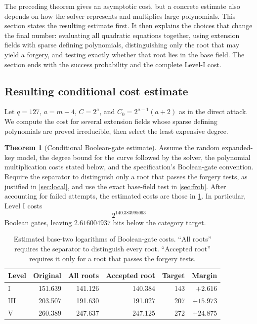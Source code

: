 \documentclass[11pt,a4paper]{article}
\theoremstyle{definition}
\newtheorem{theorem}{Theorem}[section]
\theoremstyle{remark}
\begin{document}
The preceding theorem gives an asymptotic cost, but a concrete estimate also
depends on how the solver represents and multiplies large polynomials.  This
section states the resulting estimate first.  It then explains the choices
that change the final number: evaluating all quadratic equations together,
using extension fields with sparse defining polynomials, distinguishing only
the root that may yield a forgery, and testing exactly whether that root lies
in the base field.  The section ends with the success probability and the
complete Level-I cost.

\subsection{Resulting conditional cost estimate}\label{sec:local-separator-upgrade}

Let $q=127$, $a=m-4$, $C=2^a$, and $C_0=2^{a-1}(a+2)$ as in the direct
attack.  We compute the cost for several extension fields whose sparse
defining polynomials are proved irreducible, then select the least expensive
degree.

\begin{theorem}[Conditional Boolean-gate estimate]\label{thm:headline}
Assume the random expanded-key model, the degree bound for the curve followed
by the solver, the polynomial multiplication costs stated below, and the
specification's Boolean-gate convention.  Require the separator to distinguish
only a root that passes the forgery tests, as justified in \cref{sec:local},
and use the exact base-field test in \cref{sec:frob}.  After accounting for
failed attempts, the estimated costs are those in \cref{tab:headline}.  In
particular, Level I costs
\[
 2^{140.383995063}
\]
Boolean gates, leaving $2.616004937$ bits below the category target.
\end{theorem}

\begin{table}[ht]
\centering
\caption{Estimated base-two logarithms of Boolean-gate costs.  ``All roots''
requires the separator to distinguish every root.  ``Accepted root'' requires
it only for a root that passes the forgery tests.}
\label{tab:headline}
\begin{tabular}{@{}lrrrrr@{}}
\toprule
Level & Original & All roots & Accepted root & Target & Margin\\
\midrule
I   & 151.639 & 141.126 & 140.384 & 143 & $+2.616$\\
III & 203.507 & 191.630 & 191.027 & 207 & $+15.973$\\
V   & 260.389 & 247.637 & 247.125 & 272 & $+24.875$\\
\bottomrule
\end{tabular}
\end{table}
\end{document}
